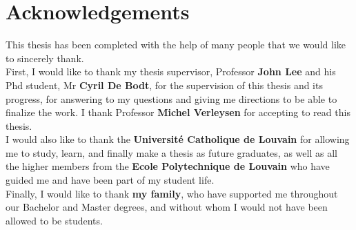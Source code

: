 \section*{Acknowledgements}

This thesis has been completed with the help of many people that we would like to sincerely thank.\\ 

\noindent First, I would like to thank my thesis supervisor, Professor \textbf{John Lee} and his Phd student, Mr \textbf{Cyril De Bodt}, for the supervision of this thesis and its progress, for answering to my questions and giving me directions to be able to finalize the work. I thank Professor \textbf{Michel Verleysen} for accepting to read this thesis.\\

\noindent I would also like to thank the \textbf{Université Catholique de Louvain} for allowing me to study, learn, and finally make a thesis as future graduates, as well as all the higher members from the \textbf{Ecole Polytechnique de Louvain} who have guided me and have been part of my student life.\\

\noindent Finally, I would like to thank \textbf{my family}, who have supported me throughout our Bachelor and Master degrees, and without whom I would not have been allowed to be students.